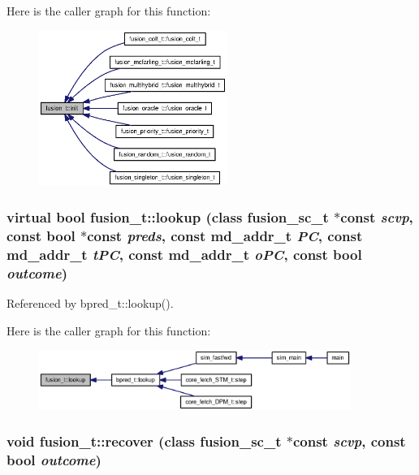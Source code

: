 Here is the caller graph for this function:\nopagebreak
\begin{figure}[H]
\begin{center}
\leavevmode
\includegraphics[width=173pt]{classfusion__t_65608af086c04e3ce10acf9c3bcbe8de_icgraph}
\end{center}
\end{figure}
\subsubsection[{lookup}]{\setlength{\rightskip}{0pt plus 5cm}virtual bool fusion\_\-t::lookup (class {\bf fusion\_\-sc\_\-t} $\ast$const  {\em scvp}, \/  const bool $\ast$const  {\em preds}, \/  const {\bf md\_\-addr\_\-t} {\em PC}, \/  const {\bf md\_\-addr\_\-t} {\em tPC}, \/  const {\bf md\_\-addr\_\-t} {\em oPC}, \/  const bool {\em outcome})\hspace{0.3cm}{\tt  [pure virtual]}}\label{classfusion__t_f656d3765cd45035faa19d0fee146c85}




Referenced by bpred\_\-t::lookup().

Here is the caller graph for this function:\nopagebreak
\begin{figure}[H]
\begin{center}
\leavevmode
\includegraphics[width=288pt]{classfusion__t_f656d3765cd45035faa19d0fee146c85_icgraph}
\end{center}
\end{figure}
\subsubsection[{recover}]{\setlength{\rightskip}{0pt plus 5cm}void fusion\_\-t::recover (class {\bf fusion\_\-sc\_\-t} $\ast$const  {\em scvp}, \/  const bool {\em outcome})\hspace{0.3cm}{\tt  [virtual]}}\label{classfusion__t_fa7bc7d99f4556983efd089a60664cee}




